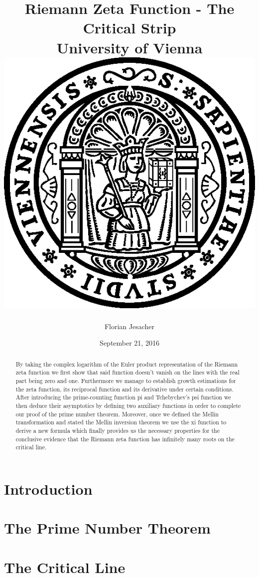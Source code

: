 \documentclass[11pt]{report}
\begin{document}
\title{
	{Riemann Zeta Function - The Critical Strip}\\
	{\large University of Vienna}\\
	{\vspace{3ex}\includegraphics[width=15ex]{University.png}}
}
\author{Florian Jesacher}
\date{September 21, 2016}
\maketitle

\begin{abstract}
By taking the complex logarithm of the Euler product representation of the Riemann zeta function we first show that said function doesn't vanish on the lines with the real part being zero and one. Furthermore we manage to establish growth estimations for the zeta function, its reciprocal function and its derivative under certain conditions. After introducing the prime-counting function pi and Tchebychev's psi function we then deduce their asymptotics by defining two auxiliary functions in order to complete our proof of the prime number theorem. Moreover, once we defined the Mellin transformation and stated the Mellin inversion theorem we use the xi function to derive a new formula which finally provides us the necessary properties for the conclusive evidence that the Riemann zeta function has infinitely many roots on the critical line.
\end{abstract}

\tableofcontents

\chapter{Introduction}


\chapter{The Prime Number Theorem}


\chapter{The Critical Line}


\appendix


\nocite{*}
\end{document}
